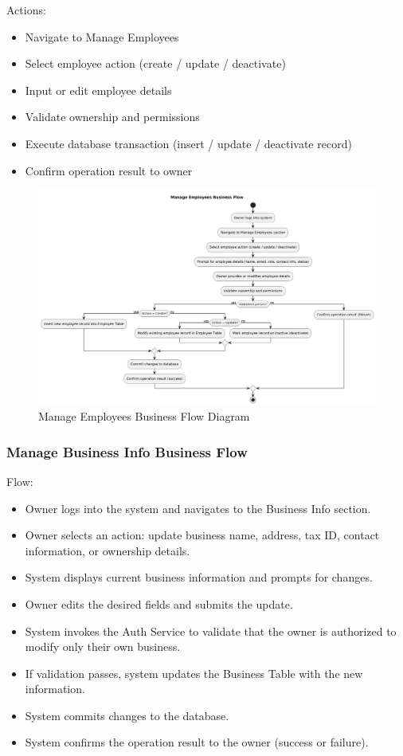 \documentclass[]{VUMIFTemplateClass}
\begin{document}
Actions:
\begin{itemize}
\setlength{\itemsep}{2pt}
\setlength{\parskip}{0pt}
\setlength{\parsep}{0pt}
\item Navigate to Manage Employees
\item Select employee action (create / update / deactivate)
\item Input or edit employee details
\item Validate ownership and permissions
\item Execute database transaction (insert / update / deactivate record)
\item Confirm operation result to owner
\end{itemize}
\begin{figure}[H]
    \centering
    \includegraphics[width=1\textwidth]{images/diagrams/business/bpmn_employee_manage.png}
    \caption{Manage Employees Business Flow Diagram}
    \label{fig:employee_manage_flow}
\end{figure}

\subsubsection{Manage Business Info Business Flow}

Flow:
\begin{itemize}
    \setlength{\itemsep}{2pt}
    \setlength{\parskip}{0pt}
    \setlength{\parsep}{0pt}
    \item Owner logs into the system and navigates to the Business Info section.
    \item Owner selects an action: update business name, address, tax ID, contact information, or ownership details.
    \item System displays current business information and prompts for changes.
    \item Owner edits the desired fields and submits the update.
    \item System invokes the Auth Service to validate that the owner is authorized to modify only their own business.
    \item If validation passes, system updates the Business Table with the new information.
    \item System commits changes to the database.
    \item System confirms the operation result to the owner (success or failure).
\end{itemize}
\end{document}
